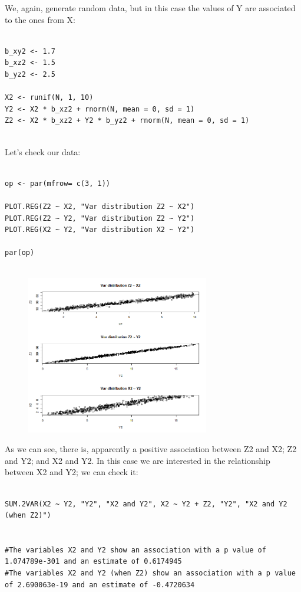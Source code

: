 \documentclass{article}
\begin{document}
We, again, generate random data, but in this case the values of Y are associated to the ones from X:


\begin{lstlisting}

b_xy2 <- 1.7 
b_xz2 <- 1.5
b_yz2 <- 2.5

X2 <- runif(N, 1, 10)
Y2 <- X2 * b_xz2 + rnorm(N, mean = 0, sd = 1)
Z2 <- X2 * b_xz2 + Y2 * b_yz2 + rnorm(N, mean = 0, sd = 1)


\end{lstlisting}

Let's check our data:


\begin{lstlisting}

op <- par(mfrow= c(3, 1))

PLOT.REG(Z2 ~ X2, "Var distribution Z2 ~ X2")
PLOT.REG(Z2 ~ Y2, "Var distribution Z2 ~ Y2")
PLOT.REG(X2 ~ Y2, "Var distribution X2 ~ Y2")

par(op)


\end{lstlisting}



\begin{figure}[h]
\includegraphics[width=8cm]{PLOT_CASE2.png}
\centering
\end{figure}


As we can see, there is, apparently a positive association between Z2 and X2;   Z2 and Y2; and X2 and Y2. In this case we are interested in the relationship between X2 and Y2; we can check it: 


\begin{lstlisting}

SUM.2VAR(X2 ~ Y2, "Y2", "X2 and Y2", X2 ~ Y2 + Z2, "Y2", "X2 and Y2 (when Z2)")


#The variables X2 and Y2 show an association with a p value of 1.074789e-301 and an estimate of 0.6174945 
#The variables X2 and Y2 (when Z2) show an association with a p value of 2.690063e-19 and an estimate of -0.4720634 

\end{lstlisting}
\end{document}
